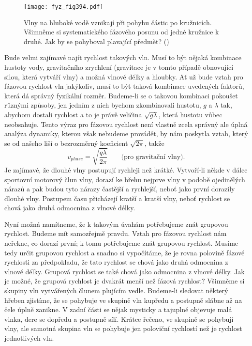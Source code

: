 {  \begin{figure}[ht!] %
    \centering
    \texttt{[image: fyz\_fig394.pdf]}
    \caption{Vlny na hluboké vodě vznikají při pohybu částic po kružnicích. Všimněme si 
             systematického fázového posunu od jedné kružnice k druhé. Jak by se pohyboval 
             plavající předmět?
             (\cite[s.~695]{Feynman01})}
    \label{fyz:fig394}
  \end{figure}

  Bude velmi zajímavé najít rychlost takových vln. Musí to být nějaká kombinace hustoty vody, 
  gravitačního zrychlení (gravitace je v tomto případě obnovující silou, která vytváří vlny) a 
  možná vlnové délky a hloubky. Ať už bude vztah pro fázovou rychlost vln jakýkoliv, musí to být 
  taková kombinace uvedených faktorů, která dá správný fyzikální rozměr. Budeme-li se o takovou 
  kombinaci pokoušet různými způsoby, jen jedním z nich bychom zkombinovali hustotu, \(g\) a 
  \(\lambda\) tak, abychom dostali rychlost a to je právě veličina \(\sqrt{g\lambda}\), která 
  hustotu vůbec neobsahuje. Tento výraz pro fázovou rychlost není vlastně zcela správný ale úplná 
  analýza dynamiky, kterou však nebudeme provádět, by nám poskytla vztah, který se od našeho liší o 
  bezrozměrný koeficient \(\sqrt{2\pi}\), takže
  \begin{equation*}
    v_{phase} = \sqrt{\dfrac{q\lambda}{2\pi}} \qquad\text{(pro gravitační vlny)}.
  \end{equation*}
  Je zajímavé, že dlouhé vlny postupují rychleji než krátké. Vytvoří-li někde v dálce sportovní 
  motorový člun vlny, dorazí ke břehu nejprve vlny v podobě ojedinělých nárazů a pak budou tyto 
  nárazy častější a rychlejší, neboť jako první dorazily dlouhé vlny. Postupem času přicházejí 
  kratší a kratší vlny, neboť rychlost se chová jako druhá odmocnina z vlnové délky.
  
  Nyní možná namítneme, že k takovým úvahám potřebujeme znát grupovou rychlost. Budeme mít 
  samozřejmě pravdu. Vztah pro fázovou rychlost nám neřekne, co dorazí první; k tomu potřebujeme 
  znát grupovou rychlost. Musíme tedy určit grupovou rychlost a snadno si vypočítáme, že je rovna 
  polovině fázové rychlosti za předpokladu, že tato rychlost se chová jako druhá odmocnina z vlnové 
  délky. Grupová rychlost se také chová jako odmocnina z vlnové délky. Jak je možné, že grupová 
  rychlost je dvakrát menší než fázová rychlost? Všimněme si skupiny vln vytvářených člunem 
  plujícím vedle. Budeme-li sledovat některý hřeben zjistíme, že se pohybuje ve skupině vln kupředu 
  a postupně slábne až na čele úplně zanikne. V zadní části se nějak mysticky a tajuplně objevuje 
  malá vlnka, dere se dopředu a postupně sílí. Krátce řečeno, ve skupině se pohybují vlny, ale 
  samotná skupina vln se pohybuje jen poloviční rychlostí než je rychlost jednotlivých vln.
  
}
